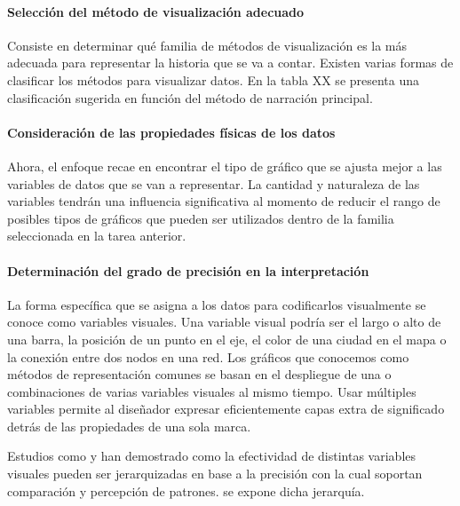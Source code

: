 \paragraph{Selección del método de visualización adecuado}

Consiste en determinar qué familia de métodos de visualización es la más adecuada para representar la historia que se va a contar. Existen varias formas de clasificar los métodos para visualizar datos. En la tabla XX se presenta una clasificación sugerida en función del método de narración principal.

\paragraph{Consideración de las propiedades físicas de los datos}

Ahora, el enfoque recae en encontrar el tipo de gráfico que se ajusta mejor a las variables de datos que se van a representar. La cantidad y naturaleza de las variables tendrán una influencia significativa al momento de reducir el rango de posibles tipos de gráficos que pueden ser utilizados dentro de la familia seleccionada en la tarea anterior.

\paragraph{Determinación del grado de precisión en la interpretación}

La forma específica que se asigna a los datos para codificarlos visualmente se conoce como variables visuales. Una variable visual podría ser el largo o alto de una barra, la posición de un punto en el eje, el color de una ciudad en el mapa o la conexión entre dos nodos en una red. Los gráficos que conocemos como métodos de representación comunes se basan en el despliegue de una o combinaciones de varias variables visuales al mismo tiempo. Usar múltiples variables permite al diseñador expresar eficientemente capas extra de significado detrás de las propiedades de una sola marca. 

Estudios como \cite{Cle84} y \cite{Mac86} han demostrado como la efectividad de distintas variables visuales pueden ser jerarquizadas en base a la precisión con la cual soportan comparación y percepción de patrones.  se expone dicha jerarquía.

